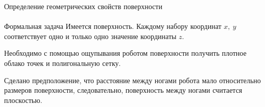 \documentclass[aspectratio=169,xcolor=table,10pt]{beamer}
\begin{document}
\begin{frame}[t]{Определение геометрических свойств поверхности}
    \framesubtitle{}
    {\large\begin{block}{Формальная задача}
            Имеется поверхность. Каждому набору координат $x,\ y$ соответствует одно и только одно значение координаты $z$. 
            \vspace{0.1cm}
            
            Необходимо с помощью ощупывания роботом поверхности получить плотное облако точек и полигональную сетку. 
            \vspace{0.1cm}
            
Сделано предположение, что расстояние между ногами робота мало относительно размеров поверхности, следовательно, поверхность между ногами считается плоскостью.
        \end{block}}


\end{frame}
\end{document}
